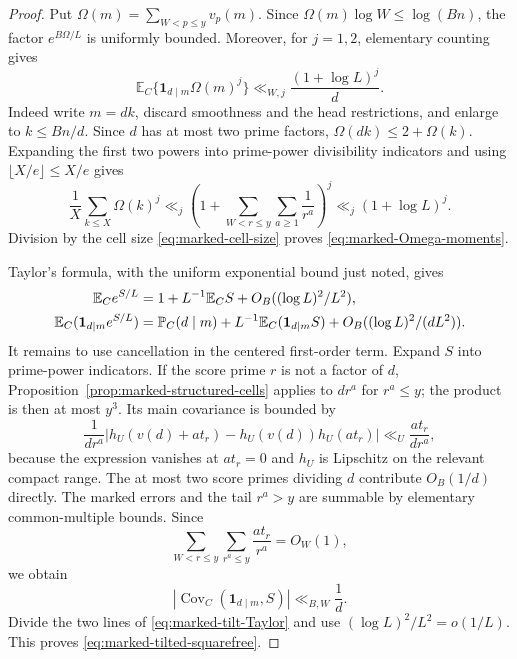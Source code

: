 \documentclass[11pt]{article}
\numberwithin{equation}{section}
\theoremstyle{definition}
\theoremstyle{remark}
\newcommand{\1}{\mathbf 1}
\begin{document}
\begin{proof}
Put \(\Omega(m)=\sum_{W<p\le y}v_p(m)\).  Since
\(\Omega(m)\log W\le\log(Bn)\), the factor
\(e^{B\Omega/L}\) is uniformly bounded.  Moreover, for \(j=1,2\),
elementary counting gives
\begin{equation}
 \mathbb E_C\{\1_{d\mid m}\Omega(m)^j\}
 \ll_{W,j}\frac{(1+\log L)^j}{d}.
 \label{eq:marked-Omega-moments}
\end{equation}
Indeed write \(m=dk\), discard smoothness and the head restrictions, and
enlarge to \(k\le Bn/d\).  Since \(d\) has at most two prime factors,
\(\Omega(dk)\le2+\Omega(k)\).  Expanding the first two powers into
prime-power divisibility indicators and using
\(\lfloor X/e\rfloor\le X/e\) gives
\[
 \frac1X\sum_{k\le X}\Omega(k)^j
 \ll_j\left(1+
   \sum_{W<r\le y}\sum_{a\ge1}\frac1{r^a}\right)^j
 \ll_j(1+\log L)^j.
\]
Division by the cell size \eqref{eq:marked-cell-size} proves
\eqref{eq:marked-Omega-moments}.

Taylor's formula, with the uniform exponential bound just noted, gives
\begin{align}
 \mathbb E_Ce^{S/L}
 &=1+L^{-1}\mathbb E_CS+O_B((\log L)^2/L^2),\notag\\
 \mathbb E_C(\1_{d\mid m}e^{S/L})
 &=\mathbb P_C(d\mid m)+L^{-1}\mathbb E_C(\1_{d\mid m}S)
       +O_B((\log L)^2/(dL^2)).
 \label{eq:marked-tilt-Taylor}
\end{align}
It remains to use cancellation in the centered first-order term.  Expand
\(S\) into prime-power indicators.  If the score prime \(r\) is not a
factor of \(d\), Proposition~\ref{prop:marked-structured-cells} applies to
\(dr^a\) for \(r^a\le y\); the product is then at most \(y^3\).  Its
main covariance is bounded by
\[
 \frac1{dr^a}
 |h_U(v(d)+at_r)-h_U(v(d))h_U(at_r)|
 \ll_U\frac{at_r}{dr^a},
\]
because the expression vanishes at \(at_r=0\) and \(h_U\) is Lipschitz
on the relevant compact range.  The at most two score primes dividing
\(d\) contribute \(O_B(1/d)\) directly.  The marked errors and the tail
\(r^a>y\) are summable by elementary common-multiple bounds.  Since
\begin{equation}
 \sum_{W<r\le y}\sum_{r^a\le y}\frac{at_r}{r^a}=O_W(1),
 \label{eq:marked-score-summability}
\end{equation}
we obtain
\begin{equation}
 |\operatorname{Cov}_C(\1_{d\mid m},S)|\ll_{B,W}\frac1d.
 \label{eq:marked-first-order-cancellation}
\end{equation}
Divide the two lines of \eqref{eq:marked-tilt-Taylor} and use
\((\log L)^2/L^2=o(1/L)\).  This proves
\eqref{eq:marked-tilted-squarefree}.


\end{proof}
\end{document}
